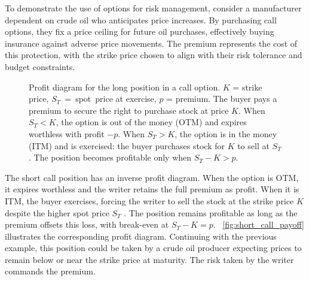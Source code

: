 \documentclass[english,12pt,a4paper,pdftex,sci,utf8]{aaltothesis}
\begin{document}
To demonstrate the use of options for risk management, consider a manufacturer dependent on crude oil who anticipates price increases. By purchasing call options, they fix a price ceiling for future oil purchases, effectively buying insurance against adverse price movements. The premium represents the cost of this protection, with the strike price chosen to align with their risk tolerance and budget constraints.

\begin{center}
\begin{figure}[H]
\centering
    \caption{Profit diagram for the long position in a call option. $K$ = strike price, \mbox{$S_T$ = spot price} at exercise, $p$ = premium. The buyer pays a premium to secure the right to purchase stock at price $K$. When $S_T < K$, the option is out of the money (OTM) and expires worthless with profit $-p$. When $S_T > K$, the option is in the money (ITM) and is exercised: the buyer purchases stock for $K$ to sell at $S_T$. The position becomes profitable only when $S_T - K > p$.}
    \label{fig:long_call_payoff}
\end{figure}
\end{center}

The short call position has an inverse profit diagram. When the option is OTM, it expires worthless and the writer retains the full premium as profit. When it is ITM, the buyer exercises, forcing the writer to sell the stock at the strike price $K$ despite the higher spot price $S_T$ \cite{hull2013fundamentals}. The position remains profitable as long as the premium offsets this loss, with break-even at $S_T - K = p$. ~\cref{fig:short_call_payoff} illustrates the corresponding profit diagram. Continuing with the previous example, this position could be taken by a crude oil producer expecting prices to remain below or near the strike price at maturity. The risk taken by the writer commands the premium.
\end{document}
